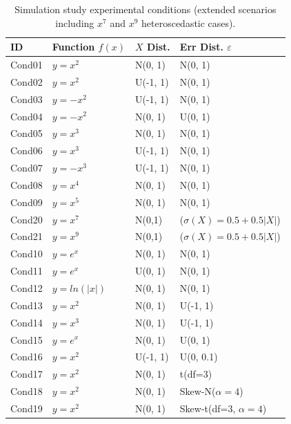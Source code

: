 \documentclass[a4paper,fleqn]{cas-sc}
\begin{document}
\begin{table}[H]
\centering
\caption{Simulation study experimental conditions (extended scenarios including $x^7$ and $x^9$ heteroscedastic cases).}\label{tab:sim_conditions}
\begin{tabular}{@{}llll@{}}
\toprule
ID & Function $f(x)$ & $X$ Dist. & Err Dist. $\varepsilon$ \\ \midrule
Cond01 & $y=x^{2}$ & N(0, 1) & N(0, 1) \\
Cond02 & $y=x^{2}$ & U(-1, 1) & N(0, 1) \\
Cond03 & $y=-x^{2}$ & U(-1, 1) & N(0, 1) \\
Cond04 & $y=-x^{2}$ & N(0, 1) & U(0, 1) \\
Cond05 & $y=x^{3}$ & N(0, 1) & N(0, 1) \\
Cond06 & $y=x^{3}$ & U(-1, 1) & N(0, 1) \\
Cond07 & $y=-x^{3}$ & U(-1, 1) & N(0, 1) \\
Cond08 & $y=x^{4}$ & N(0, 1) & N(0, 1) \\
Cond09 & $y=x^{5}$ & N(0, 1) & N(0, 1) \\
Cond20 & $y=x^{7}$ & N(0,1) & ($\sigma(X)=0.5+0.5|X|$) \\
Cond21 & $y=x^{9}$ & N(0,1) &  ($\sigma(X)=0.5+0.5|X|$) \\
Cond10 & $y=e^{x}$ & N(0, 1) & N(0, 1) \\
Cond11 & $y=e^{x}$ & U(0, 1) & N(0, 1) \\
Cond12 & $y=ln(|x|)$ & N(0, 1) & N(0, 1) \\
Cond13 & $y=x^{2}$ & N(0, 1) & U(-1, 1) \\
Cond14 & $y=x^{3}$ & N(0, 1) & U(-1, 1) \\
Cond15 & $y=e^{x}$ & N(0, 1) & U(0, 1) \\
Cond16 & $y=x^{2}$ & U(-1, 1) & U(0, 0.1) \\ 
Cond17 & $y=x^{2}$ & N(0, 1) & t(df=3) \\
Cond18 & $y=x^{2}$ & N(0, 1) & Skew-N($\alpha=4$) \\
Cond19 & $y=x^{2}$ & N(0, 1) & Skew-t(df=3, $\alpha=4$) \\ \bottomrule
\end{tabular}
\end{table}
\end{document}
